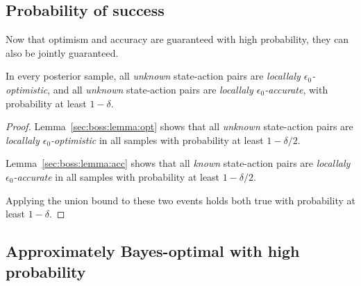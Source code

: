 


\subsection{Probability of success}

Now that optimism and accuracy are guaranteed with high probability, they can also be jointly guaranteed.

\begin{lemma}
\label{sec:boss:lemma:opt-acc}
In every posterior sample, all \emph{unknown} state-action pairs are \emph{locallaly $\epsilon_0$-optimistic}, and all \emph{unknown} state-action pairs are \emph{locallaly $\epsilon_0$-accurate}, with probability at least $1-\delta$.
\end{lemma}

\begin{proof}
Lemma~\ref{sec:boss:lemma:opt} shows that all \emph{unknown} state-action pairs are \emph{locallaly $\epsilon_0$-optimistic} in all samples with probability at least $1-\delta/2$.

Lemma~\ref{sec:boss:lemma:acc} shows that all \emph{known} state-action pairs are \emph{locallaly $\epsilon_0$-accurate} in all samples with probability at least $1-\delta/2$.

Applying the union bound to these two events holds both true with probability at least $1-\delta$.
\end{proof}



\subsection{Approximately Bayes-optimal with high probability}


